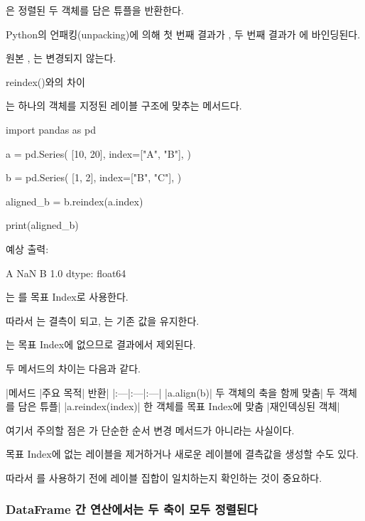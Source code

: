 은 정렬된 두 객체를 담은 튜플을 반환한다.

Python의 언패킹(unpacking)에 의해 첫 번째 결과가 , 두 번째 결과가 에 바인딩된다.

원본 , 는 변경되지 않는다.

\begin{dhknote}
\begin{dhksmry}[centered]
reindex()와의 차이
\end{dhksmry}
\end{dhknote}

는 하나의 객체를 지정된 레이블 구조에 맞추는 메서드다.

\begin{dhkcode}
import pandas as pd

a = pd.Series(
    [10, 20],
    index=["A", "B"],
)

b = pd.Series(
    [1, 2],
    index=["B", "C"],
)

aligned_b = b.reindex(a.index)

print(aligned_b)
\end{dhkcode}

예상 출력:

\begin{dhkzsh}
A    NaN
B    1.0
dtype: float64
\end{dhkzsh}

는 를 목표 Index로 사용한다.

따라서 는 결측이 되고, 는 기존 값을 유지한다.

는 목표 Index에 없으므로 결과에서 제외된다.

두 메서드의 차이는 다음과 같다.

\begin{dhktable}
|메서드	|주요 목적|	반환|
|:---|:---|:---|
|a.align(b)|	두 객체의 축을 함께 맞춤|	두 객체를 담은 튜플|
|a.reindex(index)|	한 객체를 목표 Index에 맞춤	|재인덱싱된 객체|
\end{dhktable}

여기서 주의할 점은 가 단순한 순서 변경 메서드가 아니라는 사실이다.

목표 Index에 없는 레이블을 제거하거나 새로운 레이블에 결측값을 생성할 수도 있다.

따라서 를 사용하기 전에 레이블 집합이 일치하는지 확인하는 것이 중요하다.

\subsubsection{DataFrame 간 연산에서는 두 축이 모두 정렬된다}

